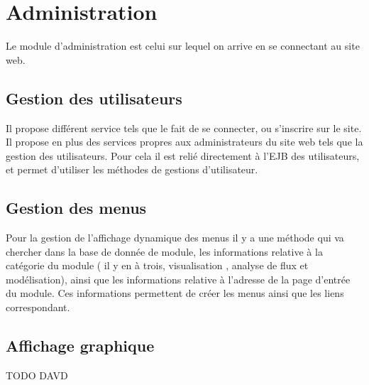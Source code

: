 \section{Administration}

Le module d'administration est celui sur lequel on arrive en se connectant au site web.

\subsection{Gestion des utilisateurs}
Il propose différent service tels que le fait de se connecter, ou s'inscrire sur le site. Il propose en plus des services propres aux administrateurs du site web tels que la gestion des utilisateurs. Pour cela il est relié directement à l'EJB des utilisateurs, et permet d'utiliser les méthodes de gestions d'utilisateur.\\

\subsection{Gestion des menus}
Pour la gestion de l'affichage dynamique des menus il y a une méthode qui va chercher dans la base de donnée de module, les informations relative à la catégorie du module ( il y en à trois, visualisation , analyse de flux et modélisation), ainsi que les informations relative à l'adresse de la page d'entrée du module. Ces informations permettent de créer les menus ainsi que les liens correspondant.\\

\subsection{Affichage graphique}
TODO DAVD